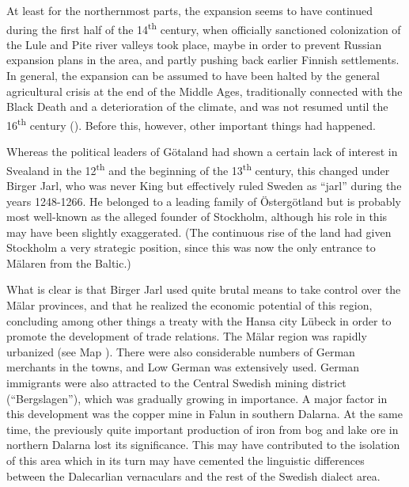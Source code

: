 
At least for the northernmost parts, the expansion seems to have continued during the first half of the 14\textsuperscript{th} century, when officially sanctioned colonization of the Lule and Pite river valleys took place, maybe in order to prevent Russian expansion plans in the area, and partly pushing back earlier Finnish settlements. In general, the expansion can be assumed to have been halted by the general agricultural crisis at the end of the Middle Ages, traditionally connected with the Black Death and a deterioration of the climate, and was not resumed until the 16\textsuperscript{th} century (\citet[248]{Myrdal2003}). Before this, however, other important things had happened.


Whereas the political leaders of Götaland had shown a certain lack of interest in Svealand in the 12\textsuperscript{th} and the beginning of the 13\textsuperscript{th} century, this changed under Birger Jarl, who was never King but effectively ruled Sweden as “jarl” during the years 1248-1266. He belonged to a leading family of Östergötland but is probably most well-known as the alleged founder of Stockholm, although his role in this may have been slightly exaggerated. (The continuous rise of the land had given Stockholm a very strategic position, since this was now the only entrance to Mälaren from the Baltic.)


What is clear is that Birger Jarl used quite brutal means to take control over the Mälar provinces, and that he realized the economic potential of this region, concluding among other things a treaty with the Hansa city Lübeck in order to promote the development of trade relations. The Mälar region was rapidly urbanized (see Map ). There were also considerable numbers of German merchants in the towns, and Low German was extensively used. German immigrants were also attracted to the Central Swedish mining district (“Bergslagen”), which was gradually growing in importance. A major factor in this development was the copper mine in Falun in southern Dalarna. At the same time, the previously quite important production of iron from bog and lake ore in northern Dalarna lost its significance. This may have contributed to the isolation of this area which in its turn may have cemented the linguistic differences between the Dalecarlian vernaculars and the rest of the Swedish dialect area. 

